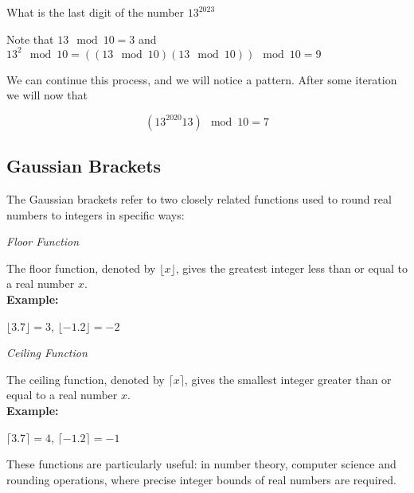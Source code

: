 What is the last digit of the number \(13^{2023}\)

Note that \(13 \mod 10 = 3\) and  \(13^2 \mod 10 =  ((13 \mod 10)  (13\mod 10)) \mod 10 = 9 \)

We can continue this process, and we will notice a pattern. After some iteration we will now that

\[(13^{2020} 13) \mod 10 = 7\]

\subsection{Gaussian Brackets}

The Gaussian brackets refer to two closely related functions used to round real numbers to integers 
in specific ways:

\emph{Floor Function}

The floor function, denoted by \(\lfloor x \rfloor\), gives the greatest integer less than or equal 
to a real number \(x\). \\

\textbf{Example:}

\(\lfloor 3.7 \rfloor = 3\), \(\lfloor -1.2 \rfloor = -2\)

\emph{Ceiling Function} 
    
The ceiling function, denoted by \(\lceil x \rceil\), gives the smallest integer greater than or 
equal to a real number \(x\). \\

\textbf{Example:}

\(\lceil 3.7 \rceil = 4\), \(\lceil -1.2 \rceil = -1\)

These functions are particularly useful: in number theory, computer science 
and rounding operations, where precise integer bounds of real numbers are required.

